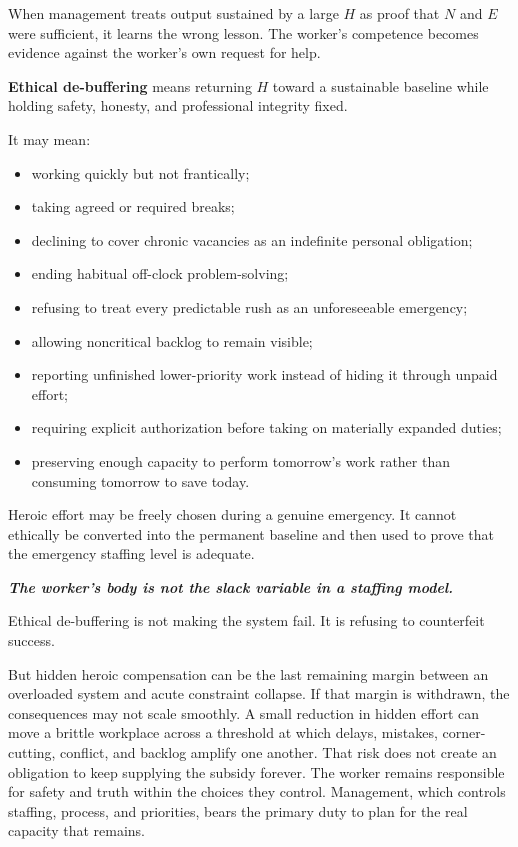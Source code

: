 \documentclass[11pt,oneside]{article}
\providecommand{\tightlist}{%
  \setlength{\itemsep}{0.22em}\setlength{\parskip}{0pt}}
\renewenvironment{quote}
  {\begin{tcolorbox}[
      enhanced,
      breakable,
      colback=ManifestLight,
      colframe=ManifestRule,
      boxrule=0pt,
      leftrule=3pt,
      arc=0pt,
      outer arc=0pt,
      left=10pt,right=10pt,top=8pt,bottom=8pt,
      before skip=0.8em,after skip=0.8em
    ]\itshape}
  {\end{tcolorbox}}
\begin{document}
When management treats output sustained by a large \(H\) as proof that
\(N\) and \(E\) were sufficient, it learns the wrong lesson. The
worker's competence becomes evidence against the worker's own request
for help.

\textbf{Ethical de-buffering} means returning \(H\) toward a sustainable
baseline while holding safety, honesty, and professional integrity
fixed.

It may mean:

\begin{itemize}
\tightlist
\item
  working quickly but not frantically;
\item
  taking agreed or required breaks;
\item
  declining to cover chronic vacancies as an indefinite personal
  obligation;
\item
  ending habitual off-clock problem-solving;
\item
  refusing to treat every predictable rush as an unforeseeable
  emergency;
\item
  allowing noncritical backlog to remain visible;
\item
  reporting unfinished lower-priority work instead of hiding it through
  unpaid effort;
\item
  requiring explicit authorization before taking on materially expanded
  duties;
\item
  preserving enough capacity to perform tomorrow's work rather than
  consuming tomorrow to save today.
\end{itemize}

Heroic effort may be freely chosen during a genuine emergency. It cannot
ethically be converted into the permanent baseline and then used to
prove that the emergency staffing level is adequate.

\begin{quote}
\textbf{The worker's body is not the slack variable in a staffing
model.}
\end{quote}

Ethical de-buffering is not making the system fail. It is refusing to
counterfeit success.

But hidden heroic compensation can be the last remaining margin between
an overloaded system and acute constraint collapse. If that margin is
withdrawn, the consequences may not scale smoothly. A small reduction in
hidden effort can move a brittle workplace across a threshold at which
delays, mistakes, corner-cutting, conflict, and backlog amplify one
another. That risk does not create an obligation to keep supplying the
subsidy forever. The worker remains responsible for safety and truth
within the choices they control. Management, which controls staffing,
process, and priorities, bears the primary duty to plan for the real
capacity that remains.
\end{document}

